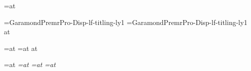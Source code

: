 \font\pageframefont=\smallcapcaption at \pageframesize

\font\booktitlefont=GaramondPremrPro-Disp-lf-titling-ly1
\font\authornamefont=GaramondPremrPro-Disp-lf-titling-ly1 at \aheadsize

\font\chaptertitlefont=\romantitlingdisplay at \aheadsize
\font\scenetitlefont=\romantitlingtext at \bheadsize
\font\authorinfotitlefont \romantitlingtext at \smalltextsize
\def\bookinfotitlefont{\scenetitlefont}

\font\rm=\romantext at \textsize
\font\it=\italictext at \textsize
\font\sc=\smallcaptext at \textsize
\font\fineprint=\romantext at \smalltextsize

%
%

\def\useemptypageframe{
  \global\headline={\line{}}
  \global\footline={\line{}}
  \global\@cleared@pagefalse
  \global\@display@pagefalse
}

\def\usedisplaypageframe{\@display@pagetrue\@cleared@pagefalse}

\def\usenormalpageframe{
  \global\headline={\pageframefont\normalpageheadline}
  \global\footline={\pageframefont\normalpagefootline}
  \global\@cleared@pagefalse
  \global\@display@pagefalse
}

\def\displaypagefootline{\pageframefont\hfil\folio\hfil}
\def\normalpageheadline{\ifodd\pageno\normaloddpageheadline\else\normalevenpageheadline\fi}
\def\normalpagefootline{\line{}}
\def\normaloddpageheadline{\title\hfil\folio}
\def\normalevenpageheadline{\folio\hfil\author}


%
%

\def\nextpage{\vfil\eject\global\@cleared@pagetrue\global\@display@pagefalse\relax}
\def\nextoddpage{\nextpage\ifodd\pageno \else \line{}\nextpage\fi}
\def\nextevenpage{\nextpage\ifodd\pageno \line{}\nextpage\else \fi}

\def\titlepage#1#2#3{
  \nextoddpage
  \useemptypageframe
  \baselinebox{\typesetbooktitle{#1}}{10}{0}
  \baselinebox{\typesetauthorname{#2}}{6}{6}
  \rightline{#3}
  \eject
}

\def\previewannouncementpage#1{
  \nextoddpage
  \line{}\vfill
  \centerline{\linelogo{20pt}}
  \vskip\baselineskip
  \centerline{\scenetitlefont proudly announces}
  \vfill
  {\usefont\booktitlefont\centered #1\par}
  \vskip\baselineskip
  \centerline{by}
  \vskip\baselineskip
  \centerline{\authornamefont\author}
  \vfill
  \centerline{Turn the page for a preview}
  \vfill
}
\def\previewpage#1{
  \nextoddpage
  \baselinebox{\typesetchapterheading{#1}}{10}{}
  \useemptypageframe
}

